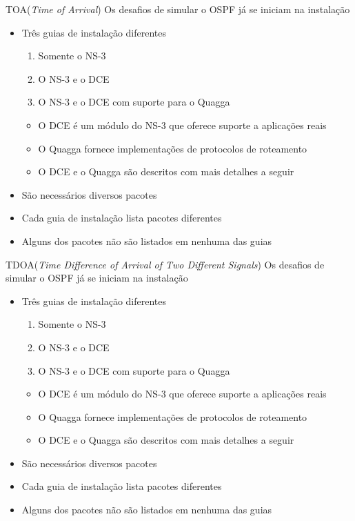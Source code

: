 \documentclass{beamer}
\newlength{\wideitemsep}
\let\olditem\item
\renewcommand{\item}{\setlength{\itemsep}{\wideitemsep}\olditem}
\begin{document}
\begin{frame}{TOA(\textit{Time of Arrival})}
Os desafios de simular o OSPF já se iniciam na instalação
\begin{itemize}
 \item Três guias de instalação diferentes %
  \begin{enumerate}
   \olditem Somente o NS-3 %
   \olditem O NS-3 e o DCE %
   \olditem O NS-3 e o DCE com suporte para o Quagga %
  \end{enumerate}
  \begin{itemize}
   \olditem O DCE é um módulo do NS-3 que oferece suporte a aplicações reais %
   \olditem O Quagga fornece implementações de protocolos de roteamento %
   \olditem O DCE e o Quagga são descritos com mais detalhes a seguir %
  \end{itemize}
 \item São necessários diversos pacotes %
 \item Cada guia de instalação lista pacotes diferentes %
 \item Alguns dos pacotes não são listados em nenhuma das guias %
\end{itemize}
\end{frame}

\begin{frame}{TDOA(\textit{Time Difference of Arrival of Two Different Signals})}
Os desafios de simular o OSPF já se iniciam na instalação
\begin{itemize}
 \item Três guias de instalação diferentes %
  \begin{enumerate}
   \olditem Somente o NS-3 %
   \olditem O NS-3 e o DCE %
   \olditem O NS-3 e o DCE com suporte para o Quagga %
  \end{enumerate}
  \begin{itemize}
   \olditem O DCE é um módulo do NS-3 que oferece suporte a aplicações reais %
   \olditem O Quagga fornece implementações de protocolos de roteamento %
   \olditem O DCE e o Quagga são descritos com mais detalhes a seguir %
  \end{itemize}
 \item São necessários diversos pacotes %
 \item Cada guia de instalação lista pacotes diferentes %
 \item Alguns dos pacotes não são listados em nenhuma das guias %
\end{itemize}
\end{frame}
\end{document}

